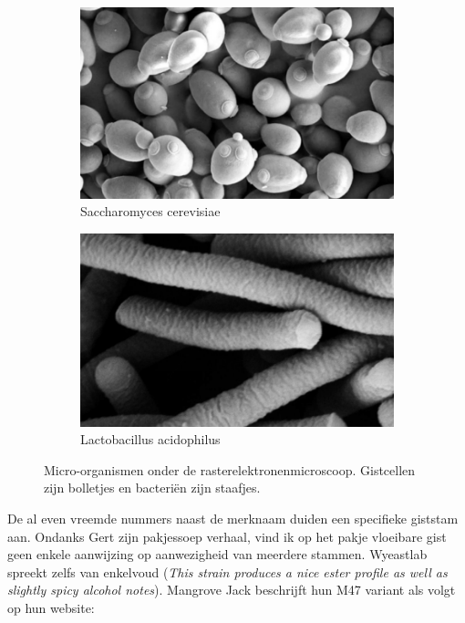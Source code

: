 \documentclass[
  11pt,
  dutch,
]{memoir}
\begin{document}
\begin{figure}[h]
    \centering
    \begin{subfigure}{0.48\textwidth}
        \includegraphics{img/bw/yeast.png} 
        \caption{Saccharomyces cerevisiae}
    \end{subfigure}
    \begin{subfigure}{0.48\textwidth}
        \includegraphics{img/bw/lacto.png}
        \caption{Lactobacillus acidophilus}
    \end{subfigure}
    \caption[Micro-organismen onder de rasterelektronenmicroscoop. \textcopyright \: Mogana Das Murtey, Patchamuthu Ramasamy/CC BY-SA 3.0.]{Micro-organismen onder de rasterelektronenmicroscoop. Gistcellen zijn bolletjes en bacteriën zijn staafjes.}
\end{figure}

De al even vreemde nummers naast de merknaam duiden een specifieke
giststam aan. Ondanks Gert zijn pakjessoep verhaal, vind ik op het pakje
vloeibare gist geen enkele aanwijzing op aanwezigheid van meerdere
stammen. Wyeastlab spreekt zelfs van enkelvoud (\emph{This strain
produces a nice ester profile as well as slightly spicy alcohol notes}).
Mangrove Jack beschrijft hun M47 variant als volgt op hun website:
\end{document}
